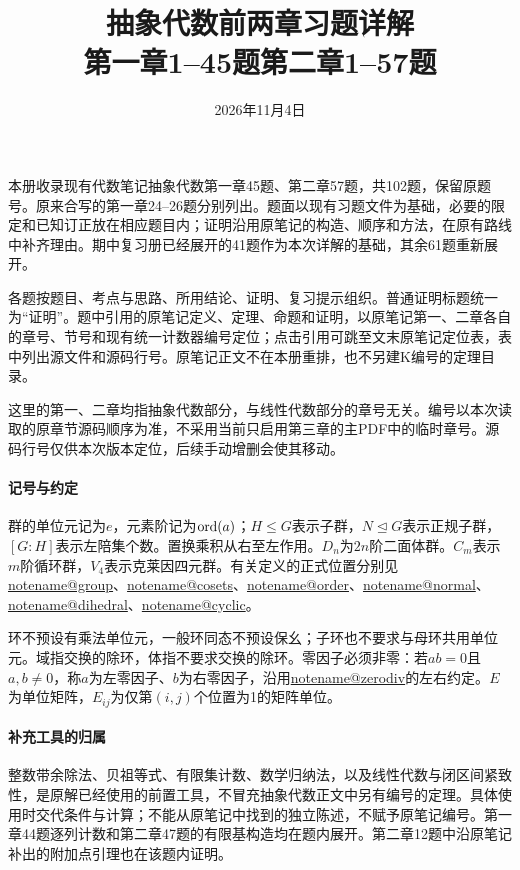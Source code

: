 \documentclass[UTF8,a4paper,11pt,fontset=windows]{ctexart}
\title{抽象代数前两章习题详解\\\large 第一章1--45题\quad 第二章1--57题}
\author{}\date{2026年11月4日}
\makeatletter
\newcommand{\noteref}[1]{\hyperref[note:#1]{\csname notename@#1\endcsname}}
\makeatother
\begin{document}
\maketitle
本册收录现有代数笔记抽象代数第一章45题、第二章57题，共102题，保留原题号。原来合写的第一章24--26题分别列出。题面以现有习题文件为基础，必要的限定和已知订正放在相应题目内；证明沿用原笔记的构造、顺序和方法，在原有路线中补齐理由。期中复习册已经展开的41题作为本次详解的基础，其余61题重新展开。

各题按题目、考点与思路、所用结论、证明、复习提示组织。普通证明标题统一为“证明”。题中引用的原笔记定义、定理、命题和证明，以原笔记第一、二章各自的章号、节号和现有统一计数器编号定位；点击引用可跳至文末原笔记定位表，表中列出源文件和源码行号。原笔记正文不在本册重排，也不另建K编号的定理目录。

这里的第一、二章均指抽象代数部分，与线性代数部分的章号无关。编号以本次读取的原章节源码顺序为准，不采用当前只启用第三章的主PDF中的临时章号。源码行号仅供本次版本定位，后续手动增删会使其移动。

\paragraph{记号与约定}
群的单位元记为$e$，元素阶记为$\operatorname{ord}(a)$；$H\leq G$表示子群，$N\trianglelefteq G$表示正规子群，$[G:H]$表示左陪集个数。置换乘积从右至左作用。$D_n$为$2n$阶二面体群。$C_m$表示$m$阶循环群，$V_4$表示克莱因四元群。有关定义的正式位置分别见\noteref{group}、\noteref{cosets}、\noteref{order}、\noteref{normal}、\noteref{dihedral}、\noteref{cyclic}。

环不预设有乘法单位元，一般环同态不预设保幺；子环也不要求与母环共用单位元。域指交换的除环，体指不要求交换的除环。零因子必须非零：若$ab=0$且$a,b\ne0$，称$a$为左零因子、$b$为右零因子，沿用\noteref{zerodiv}的左右约定。$E$为单位矩阵，$E_{ij}$为仅第$(i,j)$个位置为1的矩阵单位。

\paragraph{补充工具的归属}
整数带余除法、贝祖等式、有限集计数、数学归纳法，以及线性代数与闭区间紧致性，是原解已经使用的前置工具，不冒充抽象代数正文中另有编号的定理。具体使用时交代条件与计算；不能从原笔记中找到的独立陈述，不赋予原笔记编号。第一章44题逐列计数和第二章47题的有限基构造均在题内展开。第二章12题中沿原笔记补出的附加点引理也在该题内证明。

\tableofcontents\clearpage


\end{document}

